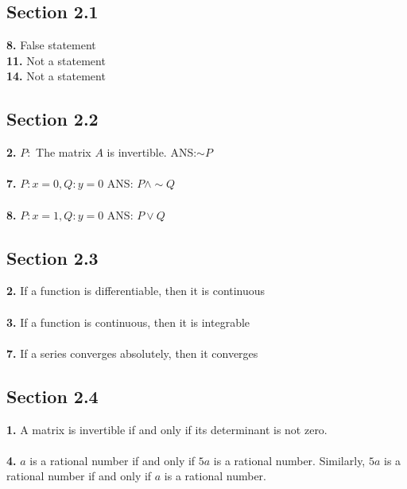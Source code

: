 \documentclass[12pt]{article}
\begin{document}
\subsection*{Section 2.1}
\textbf{8.} False statement\\
\textbf{11.} Not a statement\\
\textbf{14.} Not a statement
\subsection*{Section 2.2}
\textbf{2.} $P:$ The matrix $A$ is invertible. ANS:$\sim P$\\\\
\textbf{7.} $P: x  = 0, Q: y = 0$ ANS: $P \land \sim Q$\\\\
\textbf{8.} $P: x = 1, Q: y = 0$ ANS: $P \lor Q$
\subsection*{Section 2.3}
\textbf{2.} If a function is differentiable, then it is continuous\\\\
\textbf{3.} If a function is continuous, then it is integrable\\\\
\textbf{7.} If a series converges absolutely, then it converges
\subsection*{Section 2.4}
\textbf{1.} A matrix is invertible if and only if its determinant is not zero.\\\\
\textbf{4.} $a$ is a rational number if and only if $5a$ is a rational number. Similarly, $5a$ is a rational number if and only if $a$ is a rational number.
\end{document}
